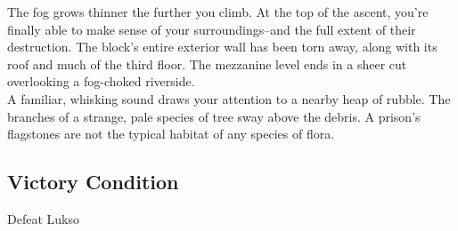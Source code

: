 The fog grows thinner the further you climb. At the top of the ascent, you’re finally able to make sense of your surroundings--and the full extent of their destruction. The block's entire exterior wall has been torn away, along with its roof and much of the third floor. The mezzanine level ends in a sheer cut overlooking a fog-choked riverside.\\

A familiar, whisking sound draws your attention to a nearby heap of rubble. The branches of a strange, pale species of tree sway above the debris. A prison's flagstones are not the typical habitat of any species of flora. 





\subsection*{Victory Condition}
Defeat Lukso


